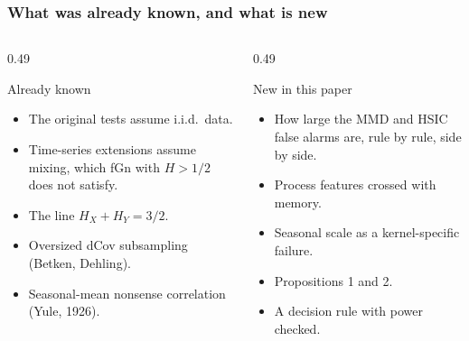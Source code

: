 \documentclass[11pt, aspectratio=169, xcolor={dvipsnames}]{beamer}
\begin{document}
\begin{frame}
\frametitle{What was already known, and what is new}
\small
\begin{columns}[T]
\begin{column}{0.49\textwidth}
\begin{block}{Already known}\small
\begin{itemize}
\item The original tests assume i.i.d.\ data.
\item Time-series extensions assume mixing, which fGn with $H>1/2$ does not satisfy.
\item The line $H_X+H_Y=3/2$.
\item Oversized dCov subsampling (Betken, Dehling).
\item Seasonal-mean nonsense correlation (Yule, 1926).
\end{itemize}
\end{block}
\end{column}
\begin{column}{0.49\textwidth}
\begin{block}{New in this paper}\small
\begin{itemize}
\item How large the MMD and HSIC false alarms are, rule by rule, side by side.
\item Process features crossed with memory.
\item Seasonal scale as a kernel-specific failure.
\item Propositions 1 and 2.
\item A decision rule with power checked.
\end{itemize}
\end{block}
\end{column}
\end{columns}
\end{frame}
\end{document}

